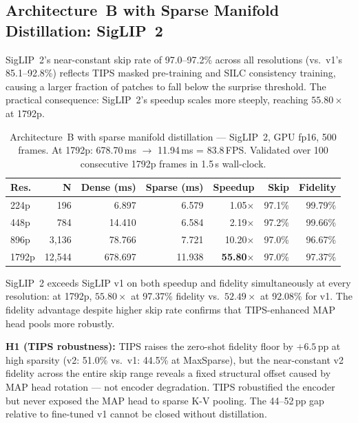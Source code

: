 \documentclass{article}
\begin{document}
\subsection{Architecture~B with Sparse Manifold Distillation: SigLIP~2}
\label{sec:siglip2_results}

SigLIP~2's near-constant skip rate of 97.0--97.2\% across all resolutions
(vs.\ v1's 85.1--92.8\%) reflects TIPS masked pre-training and SILC
consistency training, causing a larger fraction of patches to fall below
the surprise threshold. The practical consequence: SigLIP~2's speedup
scales more steeply, reaching $55.80\times$ at 1792p.

\begin{table}[htbp]
\centering
\begin{tabular}{lrrrrrr}
\toprule
\textbf{Res.} & \textbf{N} & \textbf{Dense (ms)} & \textbf{Sparse (ms)}
    & \textbf{Speedup} & \textbf{Skip} & \textbf{Fidelity} \\
\midrule
224p  &    196 &   6.897 &  6.579 &  1.05$\times$ & 97.1\% & 99.79\% \\
448p  &    784 &  14.410 &  6.584 &  2.19$\times$ & 97.2\% & 99.66\% \\
896p  &  3{,}136 &  78.766 &  7.721 & 10.20$\times$ & 97.0\% & 96.67\% \\
1792p & 12{,}544 & 678.697 & 11.938 & \textbf{55.80}$\times$ & 97.0\% & 97.37\% \\
\bottomrule
\end{tabular}
\caption{Architecture~B with sparse manifold distillation --- SigLIP~2,
GPU fp16, 500 frames. At 1792p: 678.70\,ms $\to$ 11.94\,ms = 83.8\,FPS.
Validated over 100 consecutive 1792p frames in 1.5\,s wall-clock.}
\label{tab:siglip2_multires}
\end{table}

SigLIP~2 exceeds SigLIP v1 on both speedup and fidelity simultaneously
at every resolution: at 1792p, $55.80\times$ at 97.37\% fidelity vs.\
$52.49\times$ at 92.08\% for v1. The fidelity advantage despite higher
skip rate confirms that TIPS-enhanced MAP head pools more robustly.

\textbf{H1 (TIPS robustness):} TIPS raises the zero-shot fidelity floor
by $+6.5$\,pp at high sparsity (v2: 51.0\% vs.\ v1: 44.5\% at MaxSparse),
but the near-constant v2 fidelity across the entire skip range reveals a
fixed structural offset caused by MAP head rotation — not encoder
degradation. TIPS robustified the encoder but never exposed the MAP head
to sparse K-V pooling. The 44--52\,pp gap relative to fine-tuned v1
cannot be closed without distillation.
\end{document}
